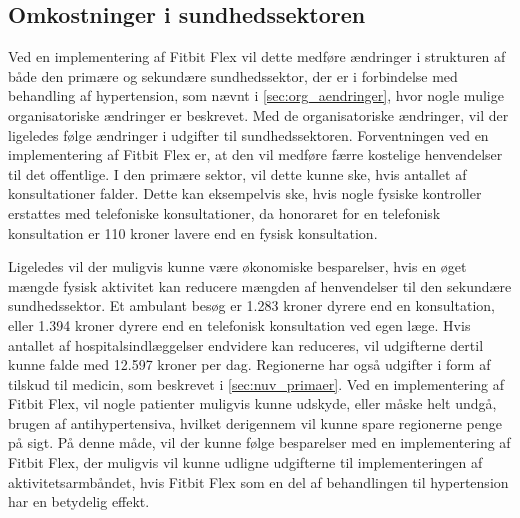 \subsection{Omkostninger i sundhedssektoren}
Ved en implementering af Fitbit Flex vil dette medføre ændringer i strukturen af både den primære og sekundære sundhedssektor, der er i forbindelse med behandling af hypertension, som nævnt i \autoref{sec:org_aendringer}, hvor nogle mulige organisatoriske ændringer er beskrevet. Med de organisatoriske ændringer, vil der ligeledes følge ændringer i udgifter til sundhedssektoren. 
Forventningen ved en implementering af Fitbit Flex er, at den vil medføre færre kostelige henvendelser til det offentlige. 
I den primære sektor, vil dette kunne ske, hvis antallet af konsultationer falder. Dette kan eksempelvis ske, hvis nogle fysiske kontroller erstattes med telefoniske konsultationer, da honoraret for en telefonisk konsultation er 110 kroner lavere end en fysisk konsultation. 
 
Ligeledes vil der muligvis kunne være økonomiske besparelser, hvis en øget mængde fysisk aktivitet kan reducere mængden af henvendelser til den sekundære sundhedssektor. Et ambulant besøg er 1.283 kroner dyrere end en konsultation, eller 1.394 kroner dyrere end en telefonisk konsultation ved egen læge. Hvis antallet af hospitalsindlæggelser endvidere kan reduceres, vil udgifterne dertil kunne falde med 12.597 kroner per dag. Regionerne har også udgifter i form af tilskud til medicin, som beskrevet i \autoref{sec:nuv_primaer}. Ved en implementering af Fitbit Flex, vil nogle patienter muligvis kunne udskyde, eller måske helt undgå, brugen af antihypertensiva, hvilket derigennem vil kunne spare regionerne penge på sigt. På denne måde, vil der kunne følge besparelser med en implementering af Fitbit Flex, der muligvis vil kunne udligne udgifterne til implementeringen af aktivitetsarmbåndet, hvis Fitbit Flex som en del af behandlingen til hypertension har en betydelig effekt. 
